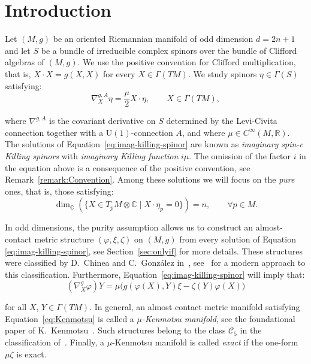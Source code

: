\documentclass[10pt,a4paper,twoside,reqno]{amsart}
\theoremstyle{plain}
\theoremstyle{definition}
\theoremstyle{remark}
\def\C{\mathbb{C}}
\def\R{\mathbb{R}}
\def\U{\mathrm{U}}
\def\R{\mathbb{R}}
\begin{document}
\section{Introduction}


Let $(M,g)$ be an oriented Riemannian manifold of odd dimension $d = 2n + 1$ and let $S$ be a bundle of irreducible complex spinors over the bundle of Clifford algebras of $(M,g)$. We use the positive convention for Clifford multiplication, that is, $X\cdot X=g(X,X)$ for every $X\in\Gamma(TM)$. We study spinors $\eta\in\Gamma(S)$ satisfying:
\begin{equation}
\label{eq:imag-killing-spinor}
\nabla^{g,A}_X \eta = \frac{\mu}{2} X\cdot \eta, \qquad X \in \Gamma(TM),
\end{equation}

\noindent
where $\nabla^{g,A}$ is the covariant derivative on $S$ determined by the Levi-Civita connection together with a $\U(1)$-connection $A$, and where $\mu \in C^{\infty}(M,\R)$. The solutions of Equation~\eqref{eq:imag-killing-spinor} are known as \emph{imaginary spin-c Killing spinors} with \emph{imaginary Killing function} $i\mu$. The omission of the factor $i$ in the equation above is a consequence of the positive convention, see Remark~\ref{remark:Convention}. Among these solutions we will focus on the \emph{pure} ones, that is, those satisfying:
\begin{equation*}
\dim_\C(\{X\in T_pM\otimes\C\mid X\cdot\eta_p=0\})=n, \qquad \forall p\in M.
\end{equation*}

\noindent
In odd dimensions, the purity assumption allows us to construct an almost-contact metric structure $(\varphi,\xi,\zeta)$ on $(M,g)$ from every solution of Equation \eqref{eq:imag-killing-spinor}, see Section~\ref{sec:onlyif} for more details. These structures were classified by D.~Chinea and C.~González in~\cite{CG1990}, see~\cite{ADDK2026} for a modern approach to this classification. Furthermore, Equation~\eqref{eq:imag-killing-spinor} will imply that:
\begin{equation}
\label{eq:Kenmotsu}
(\nabla^g_X\varphi)Y=\mu\big(g(\varphi(X),Y)\xi-\zeta(Y)\varphi(X)\big)
\end{equation}

\noindent
for all $X$, $Y \in \Gamma(TM)$. In general, an almost contact metric manifold satisfying Equation~\eqref{eq:Kenmotsu} is called a \emph{$\mu$-Kenmotsu manifold}, see the foundational paper of K.~Kenmotsu~\cite{K1972}. Such structures belong to the class $\mathcal{C}_5$ in the classification of~\cite{CG1990}. Finally, a $\mu$-Kenmotsu manifold is called \emph{exact} if the one-form $\mu\zeta$ is exact.\medskip
\end{document}
